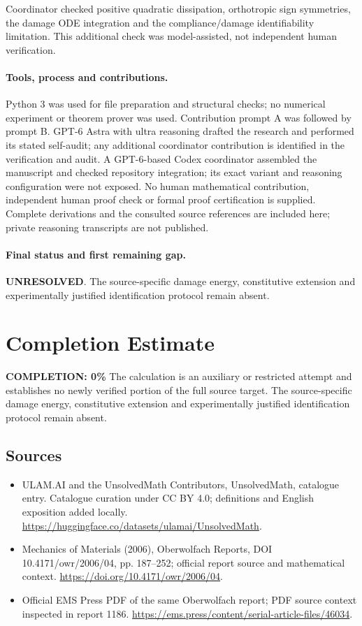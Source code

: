 \documentclass[11pt]{article}
\begin{document}
Coordinator checked positive quadratic dissipation, orthotropic sign symmetries, the damage ODE integration and the compliance/damage identifiability limitation. This additional check was model-assisted, not independent human verification.

\paragraph{Tools, process and contributions.}
Python 3 was used for file preparation and structural checks; no numerical experiment or theorem prover was used. Contribution prompt A was followed by prompt B. GPT-6 Astra with ultra reasoning drafted the research and performed its stated self-audit; any additional coordinator contribution is identified in the verification and audit. A GPT-6-based Codex coordinator assembled the manuscript and checked repository integration; its exact variant and reasoning configuration were not exposed. No human mathematical contribution, independent human proof check or formal proof certification is supplied. Complete derivations and the consulted source references are included here; private reasoning transcripts are not published.

\paragraph{Final status and first remaining gap.}
\textbf{UNRESOLVED}. The source-specific damage energy, constitutive extension and experimentally justified identification protocol remain absent.

\section{Completion Estimate}
\noindent\textbf{COMPLETION: 0\%}
The calculation is an auxiliary or restricted attempt and establishes no newly verified portion of the full source target. The source-specific damage energy, constitutive extension and experimentally justified identification protocol remain absent.

\subsection{Sources}
\begin{itemize}
\item[\hypertarget{source:statement:1}{S1}] ULAM.AI and the UnsolvedMath Contributors, UnsolvedMath, catalogue entry. Catalogue curation under CC BY 4.0; definitions and English exposition added locally.
\url{https://huggingface.co/datasets/ulamai/UnsolvedMath}.
\item[\hypertarget{source:statement:2}{S2}] Mechanics of Materials (2006), Oberwolfach Reports, DOI 10.4171/owr/2006/04, pp. 187--252; official report source and mathematical context.
\url{https://doi.org/10.4171/owr/2006/04}.
\item[\hypertarget{source:statement:3}{S3}] Official EMS Press PDF of the same Oberwolfach report; PDF source context inspected in report 1186.
\url{https://ems.press/content/serial-article-files/46034}.
\end{itemize}
\label{end:statement}
\end{document}
